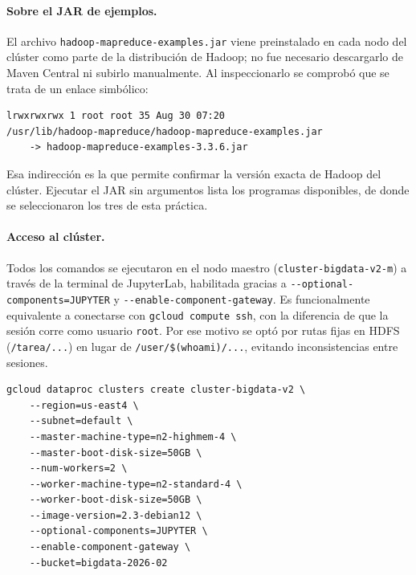 \paragraph{Sobre el JAR de ejemplos.} El archivo \texttt{hadoop-\bk{}mapreduce-\bk{}examples.\bk{}jar} viene preinstalado en cada nodo del clúster como parte de la distribución de Hadoop; no fue necesario descargarlo de Maven Central ni subirlo manualmente. Al inspeccionarlo se comprobó que se trata de un enlace simbólico:

\begin{lstlisting}[style=sh]
lrwxrwxrwx 1 root root 35 Aug 30 07:20
/usr/lib/hadoop-mapreduce/hadoop-mapreduce-examples.jar
    -> hadoop-mapreduce-examples-3.3.6.jar
\end{lstlisting}

Esa indirección es la que permite confirmar la versión exacta de Hadoop del clúster. Ejecutar el JAR sin argumentos lista los programas disponibles, de donde se seleccionaron los tres de esta práctica.

\paragraph{Acceso al clúster.} Todos los comandos se ejecutaron en el nodo maestro (\texttt{cluster-\bk{}bigdata-\bk{}v2-\bk{}m}) a través de la terminal de JupyterLab, habilitada gracias a \texttt{-\bk{}-\bk{}optional-\bk{}components=\bk{}JUPYTER} y \texttt{-\bk{}-\bk{}enable-\bk{}component-\bk{}gateway}. Es funcionalmente equivalente a conectarse con \texttt{gcloud compute ssh}, con la diferencia de que la sesión corre como usuario \texttt{root}. Por ese motivo se optó por rutas fijas en HDFS (\texttt{/tarea/...}) en lugar de \texttt{/user/\$(whoami)/...}, evitando inconsistencias entre sesiones.

\begin{lstlisting}[style=sh, caption={Creación del clúster}]
gcloud dataproc clusters create cluster-bigdata-v2 \
    --region=us-east4 \
    --subnet=default \
    --master-machine-type=n2-highmem-4 \
    --master-boot-disk-size=50GB \
    --num-workers=2 \
    --worker-machine-type=n2-standard-4 \
    --worker-boot-disk-size=50GB \
    --image-version=2.3-debian12 \
    --optional-components=JUPYTER \
    --enable-component-gateway \
    --bucket=bigdata-2026-02
\end{lstlisting}


